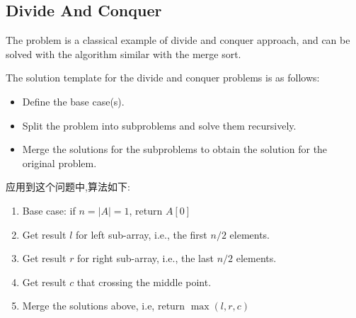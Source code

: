 \subsection{Divide And Conquer}
The problem is a classical example of divide and conquer approach, and can be solved with the algorithm similar with the merge sort.

The solution template for the divide and conquer problems is as follows:

\begin{itemize}
\item Define the base case(s).

\item Split the problem into subproblems and solve them recursively.

\item Merge the solutions for the subproblems to obtain the solution for the original problem.
\end{itemize}

应用到这个问题中,算法如下:

\begin{enumerate}
\item Base case: if $n=\lvert A\rvert=1$, return $A[0]$
\item Get result $l$ for left sub-array, i.e., the first $n/2$ elements.
\item Get result $r$ for right sub-array, i.e., the last $n/2$ elements.
\item Get result $c$ that crossing the middle point.
\item Merge the solutions above, i.e, return $\max(l, r, c)$
\end{enumerate}

